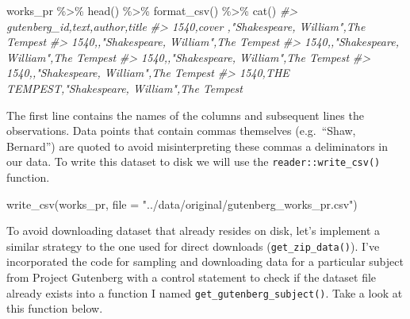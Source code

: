 \documentclass[
]{article}
\newenvironment{Shaded}{\begin{snugshade}}{\end{snugshade}}
\newcommand{\AttributeTok}[1]{\textcolor[rgb]{0.77,0.63,0.00}{#1}}
\newcommand{\CommentTok}[1]{\textcolor[rgb]{0.56,0.35,0.01}{\textit{#1}}}
\newcommand{\FunctionTok}[1]{\textcolor[rgb]{0.00,0.00,0.00}{#1}}
\newcommand{\NormalTok}[1]{#1}
\newcommand{\SpecialCharTok}[1]{\textcolor[rgb]{0.00,0.00,0.00}{#1}}
\newcommand{\StringTok}[1]{\textcolor[rgb]{0.31,0.60,0.02}{#1}}
\begin{document}
\begin{Shaded}
\begin{Highlighting}[]
\NormalTok{works\_pr }\SpecialCharTok{\%\textgreater{}\%}
    \FunctionTok{head}\NormalTok{() }\SpecialCharTok{\%\textgreater{}\%}
    \FunctionTok{format\_csv}\NormalTok{() }\SpecialCharTok{\%\textgreater{}\%}
    \FunctionTok{cat}\NormalTok{()}
\CommentTok{\#\textgreater{} gutenberg\_id,text,author,title}
\CommentTok{\#\textgreater{} 1540,cover ,"Shakespeare, William",The Tempest}
\CommentTok{\#\textgreater{} 1540,,"Shakespeare, William",The Tempest}
\CommentTok{\#\textgreater{} 1540,,"Shakespeare, William",The Tempest}
\CommentTok{\#\textgreater{} 1540,,"Shakespeare, William",The Tempest}
\CommentTok{\#\textgreater{} 1540,,"Shakespeare, William",The Tempest}
\CommentTok{\#\textgreater{} 1540,THE TEMPEST,"Shakespeare, William",The Tempest}
\end{Highlighting}
\end{Shaded}

The first line contains the names of the columns and subsequent lines the observations. Data points that contain commas themselves (e.g.~``Shaw, Bernard'') are quoted to avoid misinterpreting these commas a deliminators in our data. To write this dataset to disk we will use the \texttt{reader::write\_csv()} function.

\begin{Shaded}
\begin{Highlighting}[]
\FunctionTok{write\_csv}\NormalTok{(works\_pr, }\AttributeTok{file =} \StringTok{"../data/original/gutenberg\_works\_pr.csv"}\NormalTok{)}
\end{Highlighting}
\end{Shaded}

To avoid downloading dataset that already resides on disk, let's implement a similar strategy to the one used for direct downloads (\texttt{get\_zip\_data()}). I've incorporated the code for sampling and downloading data for a particular subject from Project Gutenberg with a control statement to check if the dataset file already exists into a function I named \texttt{get\_gutenberg\_subject()}. Take a look at this function below.
\end{document}
